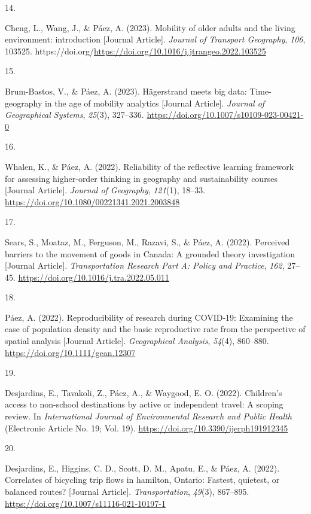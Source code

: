 \documentclass[11pt,a4paper,]{awesome-cv}
\newlength{\cslhangindent}
\newlength{\csllabelwidth}
\newenvironment{CSLReferences}[2] %
 {\begin{list}{}{%
  \setlength{\itemindent}{0pt}
  \setlength{\leftmargin}{0pt}
  \setlength{\parsep}{0pt}
  \ifodd #1
   \setlength{\leftmargin}{\cslhangindent}
   \setlength{\itemindent}{-1\cslhangindent}
  \fi
  \setlength{\itemsep}{#2\baselineskip}}}
 {\end{list}}
\newcommand{\CSLLeftMargin}[1]{\parbox[t]{\csllabelwidth}{\strut#1\strut}}
\newcommand{\CSLRightInline}[1]{\parbox[t]{\linewidth - \csllabelwidth}{\strut#1\strut}}
\begin{document}
\begin{CSLReferences}{0}{0}
\CSLLeftMargin{14. }%
\CSLRightInline{Cheng, L., Wang, J., \& Páez, A. (2023). Mobility of
older adults and the living environment: introduction {[}Journal
Article{]}. \emph{Journal of Transport Geography}, \emph{106}, 103525.
https://doi.org/\url{https://doi.org/10.1016/j.jtrangeo.2022.103525}}

\CSLLeftMargin{15. }%
\CSLRightInline{Brum-Bastos, V., \& Páez, A. (2023). Hägerstrand meets
big data: Time-geography in the age of mobility analytics {[}Journal
Article{]}. \emph{Journal of Geographical Systems}, \emph{25}(3),
327--336. \url{https://doi.org/10.1007/s10109-023-00421-0}}

\CSLLeftMargin{16. }%
\CSLRightInline{Whalen, K., \& Páez, A. (2022). Reliability of the
reflective learning framework for assessing higher-order thinking in
geography and sustainability courses {[}Journal Article{]}.
\emph{Journal of Geography}, \emph{121}(1), 18--33.
\url{https://doi.org/10.1080/00221341.2021.2003848}}

\CSLLeftMargin{17. }%
\CSLRightInline{Sears, S., Moataz, M., Ferguson, M., Razavi, S., \&
Páez, A. (2022). Perceived barriers to the movement of goods in Canada:
A grounded theory investigation {[}Journal Article{]}.
\emph{Transportation Research Part A: Policy and Practice}, \emph{162},
27--45. \url{https://doi.org/10.1016/j.tra.2022.05.011}}

\CSLLeftMargin{18. }%
\CSLRightInline{Páez, A. (2022). Reproducibility of research during
COVID‐19: Examining the case of population density and the basic
reproductive rate from the perspective of spatial analysis {[}Journal
Article{]}. \emph{Geographical Analysis}, \emph{54}(4), 860--880.
\url{https://doi.org/10.1111/gean.12307}}

\CSLLeftMargin{19. }%
\CSLRightInline{Desjardins, E., Tavakoli, Z., Páez, A., \& Waygood, E.
O. (2022). Children's access to non-school destinations by active or
independent travel: A scoping review. In \emph{International Journal of
Environmental Research and Public Health} (Electronic Article No. 19;
Vol. 19). \url{https://doi.org/10.3390/ijerph191912345}}

\CSLLeftMargin{20. }%
\CSLRightInline{Desjardins, E., Higgins, C. D., Scott, D. M., Apatu, E.,
\& Páez, A. (2022). Correlates of bicycling trip flows in hamilton,
Ontario: Fastest, quietest, or balanced routes? {[}Journal Article{]}.
\emph{Transportation}, \emph{49}(3), 867--895.
\url{https://doi.org/10.1007/s11116-021-10197-1}}


\end{CSLReferences}
\end{document}

